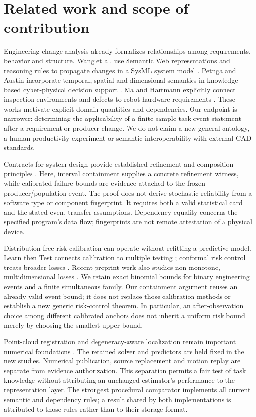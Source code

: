 \section{Related work and scope of contribution}\label{sec:r9-related}
Engineering change analysis already formalizes relationships among requirements, behavior and structure. Wang et al. use Semantic Web representations and reasoning rules to propagate changes in a SysML system model \cite{wang2018change}. Petnga and Austin incorporate temporal, spatial and dimensional semantics in knowledge-based cyber-physical decision support \cite{petnga2016}. Ma and Hartmann explicitly connect inspection environments and defects to robot hardware requirements \cite{ma2023inspection}. These works motivate explicit domain quantities and dependencies. Our endpoint is narrower: determining the applicability of a finite-sample task-event statement after a requirement or producer change. We do not claim a new general ontology, a human productivity experiment or semantic interoperability with external CAD standards.

Contracts for system design provide established refinement and composition principles \cite{benveniste2018contracts}. Here, interval containment supplies a concrete refinement witness, while calibrated failure bounds are evidence attached to the frozen producer/population event. The proof does not derive stochastic reliability from a software type or component fingerprint. It requires both a valid statistical card and the stated event-transfer assumptions. Dependency equality concerns the specified program's data flow; fingerprints are not remote attestation of a physical device.

Distribution-free risk calibration can operate without refitting a predictive model. Learn then Test connects calibration to multiple testing \cite{angelopoulos2025ltt}; conformal risk control treats broader losses \cite{angelopoulos2024crc}. Recent preprint work also studies non-monotone, multidimensional losses \cite{angelopoulos2026nonmonotone}. We retain exact binomial bounds for binary engineering events and a finite simultaneous family. Our containment argument reuses an already valid event bound; it does not replace those calibration methods or establish a new generic risk-control theorem. In particular, an after-observation choice among different calibrated anchors does not inherit a uniform risk bound merely by choosing the smallest upper bound.

Point-cloud registration and degeneracy-aware localization remain important numerical foundations \cite{besl1992icp,chen1992,xicp2024,drpm2024}. The retained solver and predictors are held fixed in the new studies. Numerical publication, source replacement and motion replay are separate from evidence authorization. This separation permits a fair test of task knowledge without attributing an unchanged estimator's performance to the representation layer. The strongest procedural comparator implements all current semantic and dependency rules; a result shared by both implementations is attributed to those rules rather than to their storage format.
